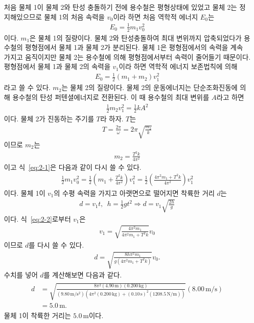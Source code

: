\documentclass[floatfix,nofootinbib,superscriptaddress,fleqn]{revtex4-2}
\begin{document}
처음 물체 1이 물체 2와 탄성 충돌하기 전에 용수철은 평형상태에 있었고 물체 2는
정지해있으므로 물체 1의 처음 속력을 $v_0$이라 하면 처음 역학적 에너지 $E_0$는
\begin{align}
  E_0 = \frac{1}{2}m_1v_0^2
\end{align}
이다. $m_1$은 물체 1의 질량이다. 물체 2와 탄성충돌하여 최대 변위까지 압축되었다가 
용수철의 평형점에서 물체 1과 물체 2가 분리된다. 물체 1은 평형점에서의 속력을 계속 가지고
움직이지만 물체 2는 용수철에 의해 평형점에서부터 속력이 줄어들기 때문이다. 
평형점에서 물체 1과 물체 2의 속력을 $v_1$이라 하면 역학적 에너지 보존법칙에 의해
\begin{align}\label{eq:2-1}
  E_0 = \frac{1}{2}(m_1+m_2)v_1^2
\end{align} 
라고 쓸 수 있다. $m_2$는 물체 2의 질량이다. 
물체 2의 운동에너지는 단순조화진동에 의해 용수철의
탄성 퍼텐셜에너지로 전환된다. 이 때 용수철의 최대 변위를 $A$라고 하면 
\begin{align}
  \frac{1}{2}m_2v_1^2 = \frac{1}{2}kA^2
\end{align}
이다. 물체 2가 진동하는 주기를 $T$라 하자. $T$는
\begin{align}
  T = \frac{2\pi}{\omega} = 2\pi\sqrt{\frac{m_2}{k}}
\end{align}
이므로 $m_2$는
\begin{align}
  m_2 =\frac{T^2k}{4\pi^2}
\end{align}
이고 식~\eqref{eq:2-1}은 다음과 같이 다시 쓸 수 있다.
\begin{align}\label{eq:2-2}
  \frac{1}{2}m_1v_0^2
  =\frac{1}{2}\left(m_1+\frac{T^2k}{4\pi^2}\right)v_1^2
  =\frac{1}{2}\left(\frac{4\pi^2m_1+T^2k}{4\pi^2}\right)v_1^2
\end{align}
이다. 물체 1이 $v_1$의 수평 속력을 가지고 아랫면으로 떨어지면 착륙한 거리 $d$는
\begin{align}
  d = v_1t,\,\,\,h=\frac{1}{2}gt^2\Longrightarrow d = v_1\sqrt{\frac{2h}{g}}
\end{align}
이다. 식~\eqref{eq:2-2}로부터 $v_1$은
\begin{align}
  v_1 = \sqrt{\frac{4\pi^2m_1}{4\pi^2m_1+T^2k}}v_0
\end{align}
이므로 $d$를 다시 쓸 수 있다.
\begin{align}
  d = \sqrt{\frac{8h\pi^2m_1}{g(4\pi^2m_1+T^2k)}}v_0.
\end{align}
수치를 넣어 $d$를 계산해보면 다음과 같다.
\begin{align}
  \begin{split}
    d &= \sqrt{\frac{8\pi^2(4.90\,\mathrm{m})(0.200\,\mathrm{kg})}
    {(9.80\,\mathrm{m/s^2})(4\pi^2(0.200\,\mathrm{kg})
    +(0.10\,\mathrm{s})^2(1208.5\,\mathrm{N/m}))}}(8.00\,\mathrm{m/s})  \\
    &= 5.0\,\mathrm{m}.
  \end{split}
\end{align}
물체 1이 착륙한 거리는 $5.0\,\mathrm{m}$이다.
\end{document}
